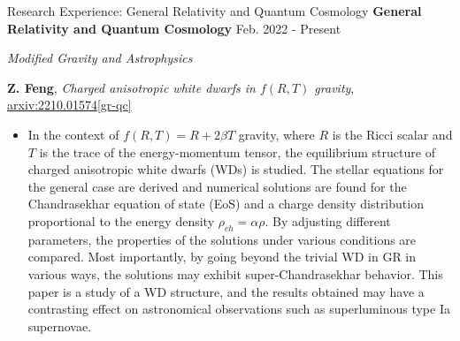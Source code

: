 \documentclass[9pt,aspectratio=169,hyperref=colorlinks]{beamer}
\begin{document}
\begin{frame}{Research Experience: General Relativity and Quantum Cosmology}
    \textbf{General Relativity and Quantum Cosmology} \hfill Feb. 2022 - Present

    \smallskip \quad \textit{Modified Gravity and Astrophysics}

    \textbf{Z. Feng}, \textit{Charged anisotropic white dwarfs in $f\left({R}, {T}\right)$ gravity}, \href{https://arxiv.org/abs/2210.01574}{arxiv:2210.01574[gr-qc]}

    \begin{itemize}
        \item In the context of $f(R, T) = R + 2 \beta T$ gravity, where $R$ is the Ricci scalar and $T$ is the trace of the energy-momentum tensor, the equilibrium structure of charged anisotropic white dwarfs (WDs) is studied. The stellar equations for the general case are derived and numerical solutions are found for the Chandrasekhar equation of state (EoS) and a charge density distribution proportional to the energy density $\rho_{ch} = \alpha \rho$. By adjusting different parameters, the properties of the solutions under various conditions are compared. Most importantly, by going beyond the trivial WD in GR in various ways, the solutions may exhibit super-Chandrasekhar behavior. This paper is a study of a WD structure, and the results obtained may have a contrasting effect on astronomical observations such as superluminous type Ia supernovae.
    \end{itemize}
\end{frame}
\end{document}

